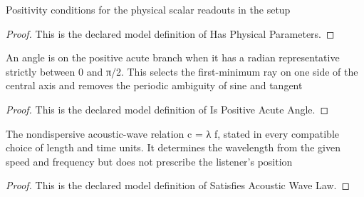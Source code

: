 \begin{definition}
  \label{def:physics:phyx-mini-0175:phyxminiproblems-problemphyxmini0175-hasphysicalparameters}
  Positivity conditions for the physical scalar readouts in the setup
\end{definition}
\begin{proof}
  This is the declared model definition of Has Physical Parameters.
\end{proof}
\begin{definition}
  \label{def:physics:phyx-mini-0175:phyxminiproblems-problemphyxmini0175-ispositiveacuteangle}
  An angle is on the positive acute branch when it has a radian representative strictly between 0 and π/2. This selects the first-minimum ray on one side of the central axis and removes the periodic ambiguity of sine and tangent
\end{definition}
\begin{proof}
  This is the declared model definition of Is Positive Acute Angle.
\end{proof}
\begin{definition}
  \label{def:physics:phyx-mini-0175:phyxminiproblems-problemphyxmini0175-satisfiesacousticwavelaw}
  The nondispersive acoustic-wave relation c = λ f, stated in every compatible choice of length and time units. It determines the wavelength from the given speed and frequency but does not prescribe the listener's position
\end{definition}
\begin{proof}
  This is the declared model definition of Satisfies Acoustic Wave Law.
\end{proof}
